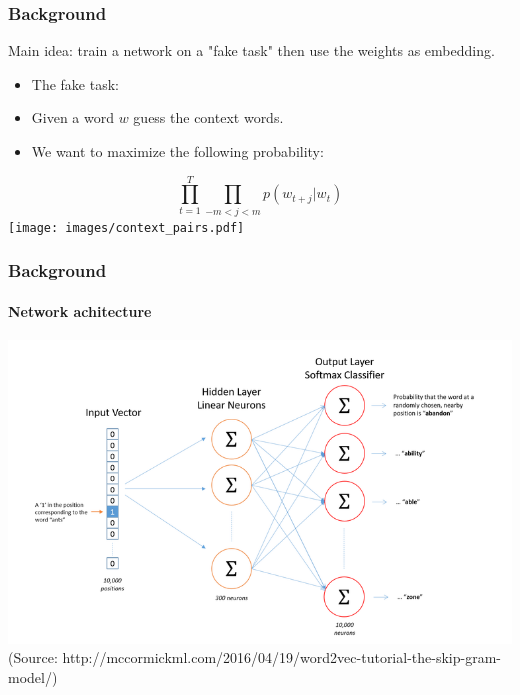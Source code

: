 \begin{frame}\frametitle{Background}
Main idea: train a network on a "fake task" then use the weights as embedding. \bigskip
\begin{itemize}
\item The fake task:
\item Given a word $w$ guess the context words. 
\item We want to maximize the following probability:
\end{itemize}
\begin{equation}
\prod_{t=1}^T \prod_{-m<j<m}  p(w_{t+j}|w_t)
\end{equation}
\texttt{[image: images/context\_pairs.pdf]}
\end{frame}

\begin{frame}\frametitle{Background}\framesubtitle{Network achitecture}
\includegraphics[scale=0.37]{images/ntw_architecture.png}
(Source: http://mccormickml.com/2016/04/19/word2vec-tutorial-the-skip-gram-model/) 
\end{frame}

